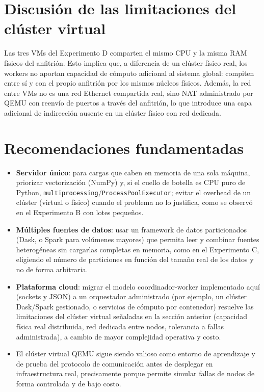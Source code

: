 \documentclass[11pt]{article}
\begin{document}
\section{Discusión de las limitaciones del clúster virtual}

Las tres VMs del Experimento D comparten el mismo CPU y la misma RAM físicos
del anfitrión. Esto implica que, a diferencia de un clúster físico real, los
workers no aportan capacidad de cómputo adicional al sistema global: compiten
entre sí y con el propio anfitrión por los mismos núcleos físicos. Además, la
red entre VMs no es una red Ethernet compartida real, sino NAT administrado
por QEMU con reenvío de puertos a través del anfitrión, lo que introduce una
capa adicional de indirección ausente en un clúster físico con red dedicada.

\section{Recomendaciones fundamentadas}

\begin{itemize}
  \item \textbf{Servidor único}: para cargas que caben en memoria de una sola
  máquina, priorizar vectorización (NumPy) y, si el cuello de botella es
  CPU puro de Python, \texttt{multiprocessing}/\texttt{ProcessPoolExecutor};
  evitar el overhead de un clúster (virtual o físico) cuando el problema no
  lo justifica, como se observó en el Experimento B con lotes pequeños.
  \item \textbf{Múltiples fuentes de datos}: usar un framework de datos
  particionados (Dask, o Spark para volúmenes mayores) que permita leer y
  combinar fuentes heterogéneas sin cargarlas completas en memoria, como en
  el Experimento C, eligiendo el número de particiones en función del
  tamaño real de los datos y no de forma arbitraria.
  \item \textbf{Plataforma cloud}: migrar el modelo coordinador-worker
  implementado aquí (sockets y JSON) a un orquestador administrado (por
  ejemplo, un clúster Dask/Spark gestionado, o servicios de cómputo por
  contenedor) resuelve las limitaciones del clúster virtual señaladas en la
  sección anterior (capacidad física real distribuida, red dedicada entre
  nodos, tolerancia a fallas administrada), a cambio de mayor complejidad
  operativa y costo.
  \item El clúster virtual QEMU sigue siendo valioso como entorno de
  aprendizaje y de prueba del protocolo de comunicación antes de desplegar
  en infraestructura real, precisamente porque permite simular fallas de
  nodos de forma controlada y de bajo costo.
\end{itemize}
\end{document}
